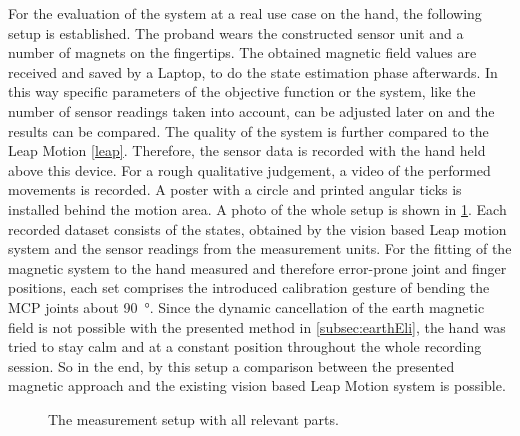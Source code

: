 For the evaluation of the system at a real use case on the hand, the following setup is established. The proband wears the constructed sensor unit and a number of magnets on the fingertips. The obtained magnetic field values are received and saved by a Laptop, to do the state estimation phase afterwards. In this way specific parameters of the objective function or the system, like the number of sensor readings taken into account, can be adjusted later on and the results can be compared. The quality of the system is further compared to the Leap Motion \ref{leap}. Therefore, the sensor data is recorded with the hand held above this device. For a rough qualitative judgement, a video of the performed movements is recorded. A poster with a circle and printed angular ticks is installed behind the motion area. A photo of the whole setup is shown in \ref{fig:setup}. Each recorded dataset consists of the states, obtained by the vision based Leap motion system and the sensor readings from the measurement units. For the fitting of the magnetic system to the hand measured and therefore error-prone joint and finger positions, each set comprises the introduced calibration gesture of bending the \ac{MCP} joints about \SI{90}{\degree}. Since the dynamic cancellation of the earth magnetic field is not possible with the presented method in \ref{subsec:earthEli}, the hand was tried to stay calm and at a constant position throughout the whole recording session. So in the end, by this setup a comparison between the presented magnetic approach and the existing vision based Leap Motion system is possible.
\begin{figure}[!htb]
\centering
{}
\caption[Measurement setup]
{The measurement setup with all relevant parts.}
\label{fig:setup}
\end{figure}


